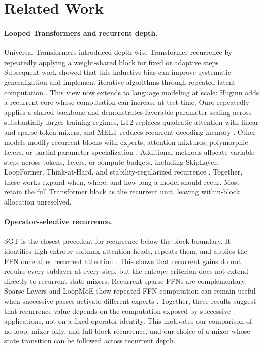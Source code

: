 \documentclass[letterpaper]{article} %
\begin{document}
\section{Related Work}

\paragraph{Looped Transformers and recurrent depth.}
Universal Transformers introduced depth-wise Transformer recurrence by
repeatedly applying a weight-shared block for fixed or adaptive steps
\cite{dehghani2019universaltransformers}. Subsequent work showed that this
inductive bias can improve systematic generalization and implement iterative
algorithms through repeated latent computation
\cite{yang2024loopedtransformersbetterlearning,saunshi2025reasoninglatentthoughtspower}.
This view now extends to language modeling at scale: Huginn adds a recurrent
core whose computation can increase at test time, Ouro repeatedly applies a
shared backbone and demonstrates favorable parameter scaling across
substantially larger training regimes, LT2 replaces quadratic attention with
linear and sparse token mixers, and MELT reduces recurrent-decoding memory
\cite{geiping2025scalingtesttimecomputelatent,zhu2025ouro,deng2026lt2lineartimeloopedtransformers,vendrell2026memoryefficient}.
Other models modify recurrent blocks with experts, attention mixtures,
polymorphic layers, or partial parameter specialization
\cite{csordas2024moeut,knupp2026depthrecurrentattentionmixturesgiving,chen2026polymorphicuniversal,zeitoun2026hyperlooptransformers}.
Additional methods allocate variable steps across tokens, layers, or compute
budgets, including SkipLayer, LoopFormer, Think-at-Hard, and
stability-regularized recurrence
\cite{li2025skiplayerloopit,jeddi2026loopformer,fu2026thinkhard,yang2026stabilizing,fan2025loopedtransformerslengthgeneralization}.
Together, these works expand when, where, and how long a model should recur.
Most retain the full Transformer block as the recurrent unit, leaving
within-block allocation unresolved.

\paragraph{Operator-selective recurrence.}
SGT is the closest precedent for recurrence below the block boundary. It
identifies high-entropy softmax attention heads, repeats them, and applies the
FFN once after recurrent attention \cite{chen2026sparsegrowingtransformertrainingtime}.
This shows that recurrent gains do not require every sublayer at every step,
but the entropy criterion does not extend directly to recurrent-state mixers.
Recurrent sparse FFNs are complementary: Sparse Layers and LoopMoE show
repeated FFN computation can remain useful when successive passes activate
different experts \cite{lee2026sparselayerscriticalscaling,chen2026loopmoeunifyingiterativecomputation}.
Together, these results suggest that recurrence value depends on the computation
exposed by successive applications, not on a fixed operator identity. This
motivates our comparison of no-loop, mixer-only, and full-block recurrence, and
our choice of a mixer whose state transition can be followed across recurrent
depth.
\end{document}
